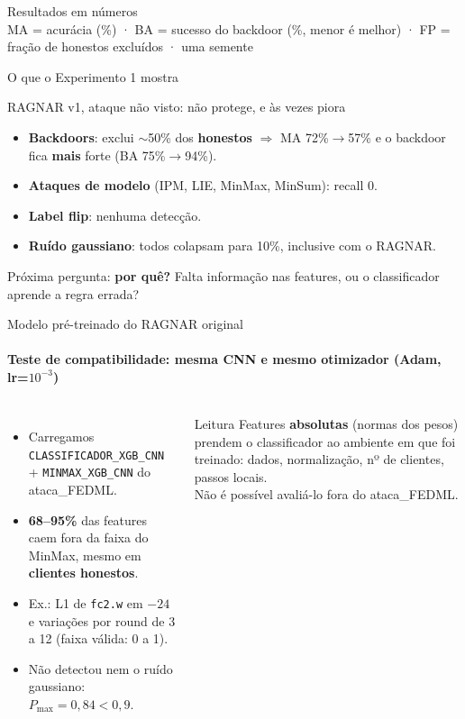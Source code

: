 \documentclass[aspectratio=169,11pt,xcolor=table]{beamer}
\begin{document}
\begin{frame}{Resultados em números}
  \centering\small
  \resizebox{0.92\textwidth}{!}{}\\[0.6em]
  \footnotesize MA = acurácia (\%) · BA = sucesso do backdoor (\%, menor é melhor) · FP = fração de honestos excluídos · uma semente
\end{frame}

\begin{frame}{O que o Experimento 1 mostra}
  \begin{alertblock}{RAGNAR v1, ataque não visto: não protege, e às vezes piora}
    \begin{itemize}
      \item \textbf{Backdoors}: exclui $\sim$50\% dos \textbf{honestos} $\Rightarrow$ MA 72\%$\to$57\% e o backdoor fica \textbf{mais} forte (BA 75\%$\to$94\%).
      \item \textbf{Ataques de modelo} (IPM, LIE, MinMax, MinSum): recall 0.
      \item \textbf{Label flip}: nenhuma detecção.
      \item \textbf{Ruído gaussiano}: todos colapsam para 10\%, inclusive com o RAGNAR.
    \end{itemize}
  \end{alertblock}
  \vspace{0.4em}
  Próxima pergunta: \textbf{por quê?} Falta informação nas features, ou o classificador aprende a regra errada?
\end{frame}

\begin{frame}{Modelo pré-treinado do RAGNAR original}
  \framesubtitle{Teste de compatibilidade: mesma CNN e mesmo otimizador (Adam, lr=$10^{-3}$)}
  \begin{columns}[T]
    \begin{itemize}
      \item Carregamos \texttt{CLASSIFICADOR\_XGB\_CNN} + \texttt{MINMAX\_XGB\_CNN} do ataca\_FEDML.
      \item \textbf{68--95\%} das features caem fora da faixa do MinMax, mesmo em \textbf{clientes honestos}.
      \item Ex.: L1 de \texttt{fc2.w} em $-24$ e variações por round de 3 a 12 (faixa válida: 0 a 1).
      \item Não detectou nem o ruído gaussiano: $P_{\max}=0{,}84 < 0{,}9$.
    \end{itemize}
    \begin{alertblock}{Leitura}
      Features \textbf{absolutas} (normas dos pesos) prendem o classificador ao ambiente em que foi treinado: dados, normalização, nº de clientes, passos locais.\\[0.4em]
      Não é possível avaliá-lo fora do ataca\_FEDML.
    \end{alertblock}
  \end{columns}
\end{frame}
\end{document}
